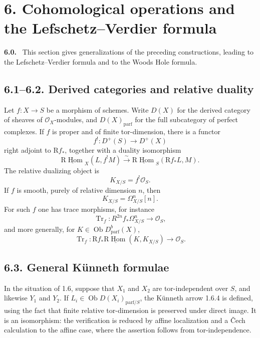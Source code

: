 \documentclass[12pt]{article}
\newcommand{\Hom}{\operatorname{Hom}}
\newcommand{\Tr}{\operatorname{Tr}}
\newcommand{\ob}{\operatorname{Ob}}
\newcommand{\R}{\mathrm R}
\newcommand{\cO}{\mathcal O}
\newenvironment{statement}[1]{\par\medskip\noindent\textbf{#1.}\ }{\par\medskip}
\begin{document}
\section*{6. Cohomological operations and the Lefschetz--Verdier formula}

\begin{statement}{6.0}
This section gives generalizations of the preceding constructions, leading to the Lefschetz--Verdier formula and to the Woods Hole formula.
\end{statement}

\subsection*{6.1--6.2. Derived categories and relative duality}
Let $f:X\to S$ be a morphism of schemes. Write $D(X)$ for the derived category of sheaves of $\cO_X$-modules, and $D(X)_{\mathrm{parf}}$ for the full subcategory of perfect complexes. If $f$ is proper and of finite tor-dimension, there is a functor
\begin{equation}
   f^!:D^{+}(S)\to D^{+}(X)
   \tag{6.1.1}
\end{equation}
right adjoint to $\R f_*$, together with a duality isomorphism
\begin{equation}
   \underline{\R\Hom}_X(L,f^!M)
      \xrightarrow{\sim}
   \underline{\R\Hom}_S(\R f_*L,M).
   \tag{6.1.2}
\end{equation}
The relative dualizing object is
\[
   K_{X/S}=f^!\cO_S.
\]
If $f$ is smooth, purely of relative dimension $n$, then
\[
   K_{X/S}=\Omega^n_{X/S}[n].
\]
For such $f$ one has trace morphisms, for instance
\begin{equation}
   \Tr_f:R^{2n}f_*\Omega^n_{X/S}\to \cO_S,
   \tag{6.2.1}
\end{equation}
and more generally, for $K\in\ob D^b_{\mathrm{parf}}(X)$,
\begin{equation}
   \Tr_f:
   \R f_*\underline{\R\Hom}(K,K_{X/S})\to \cO_S.
   \tag{6.2.2}
\end{equation}

\subsection*{6.3. General Künneth formulae}
In the situation of 1.6, suppose that $X_1$ and $X_2$ are tor-independent over $S$, and likewise $Y_1$ and $Y_2$. If $L_i\in\ob D(X_i)_{\mathrm{parf}/S}$, the Künneth arrow 1.6.4 is defined, using the fact that finite relative tor-dimension is preserved under direct image. It is an isomorphism: the verification is reduced by affine localization and a Čech calculation to the affine case, where the assertion follows from tor-independence.
\end{document}
